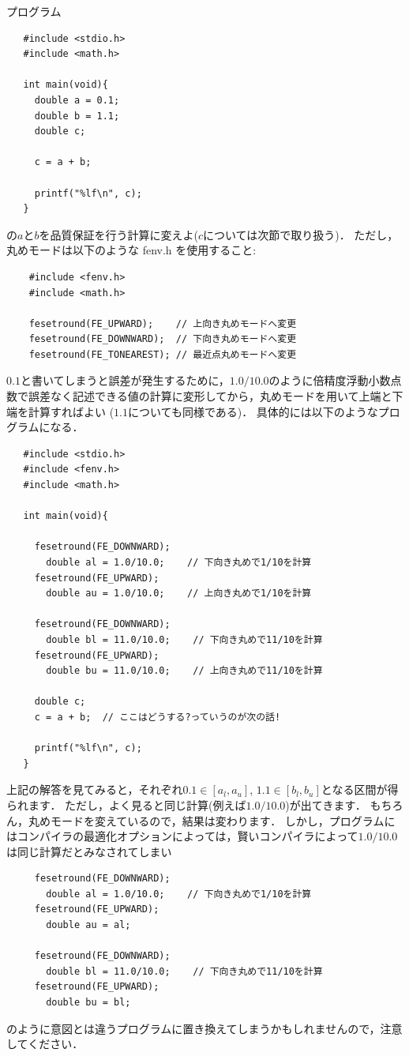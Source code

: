 \Mondai
プログラム
\begin{verbatim}
   #include <stdio.h>
   #include <math.h>
	
   int main(void){
     double a = 0.1;
     double b = 1.1;
     double c;

     c = a + b;
  
     printf("%lf\n", c);
   }
\end{verbatim}
の$a$と$b$を品質保証を行う計算に変えよ($c$については次節で取り扱う)．
ただし，丸めモードは以下のような fenv.h を使用すること:
\begin{verbatim}
	#include <fenv.h>
	#include <math.h>

	fesetround(FE_UPWARD);    // 上向き丸めモードへ変更
	fesetround(FE_DOWNWARD);  // 下向き丸めモードへ変更
	fesetround(FE_TONEAREST); // 最近点丸めモードへ変更
\end{verbatim}

\vspace{5mm}

\Kaitourei
$0.1$と書いてしまうと誤差が発生するために，$1.0/10.0$のように倍精度浮動小数点数で誤差なく記述できる値の計算に変形してから，丸めモードを用いて上端と下端を計算すればよい ($1.1$についても同様である)．
具体的には以下のようなプログラムになる．
\begin{verbatim}
   #include <stdio.h>
   #include <fenv.h>
   #include <math.h>
	
   int main(void){

     fesetround(FE_DOWNWARD);
       double al = 1.0/10.0;    // 下向き丸めで1/10を計算
     fesetround(FE_UPWARD);
       double au = 1.0/10.0;    // 上向き丸めで1/10を計算

     fesetround(FE_DOWNWARD);
       double bl = 11.0/10.0;    // 下向き丸めで11/10を計算
     fesetround(FE_UPWARD);
       double bu = 11.0/10.0;    // 上向き丸めで11/10を計算

     double c;
     c = a + b;  // ここはどうする?っていうのが次の話!

     printf("%lf\n", c);
   }
\end{verbatim}



上記の解答を見てみると，それぞれ$0.1 \in [a_l, a_u]$, $1.1 \in [b_l, b_u]$となる区間が得られます．
ただし，よく見ると同じ計算(例えば$1.0/10.0$)が出てきます．
もちろん，丸めモードを変えているので，結果は変わります．
しかし，プログラムにはコンパイラの最適化オプションによっては，賢いコンパイラによって$1.0/10.0$は同じ計算だとみなされてしまい
\begin{verbatim}
     fesetround(FE_DOWNWARD);
       double al = 1.0/10.0;    // 下向き丸めで1/10を計算
     fesetround(FE_UPWARD);
       double au = al;

     fesetround(FE_DOWNWARD);
       double bl = 11.0/10.0;    // 下向き丸めで11/10を計算
     fesetround(FE_UPWARD);
       double bu = bl;
\end{verbatim}
のように意図とは違うプログラムに置き換えてしまうかもしれませんので，注意してください．


